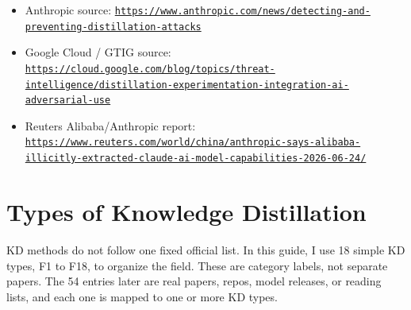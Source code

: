 \documentclass[10pt]{article}
\begin{document}
\begin{itemize}
\item Anthropic source: \href{https://www.anthropic.com/news/detecting-and-preventing-distillation-attacks}{\nolinkurl{https://www.anthropic.com/news/detecting-and-preventing-distillation-attacks}}
\item Google Cloud / GTIG source: \href{https://cloud.google.com/blog/topics/threat-intelligence/distillation-experimentation-integration-ai-adversarial-use}{\nolinkurl{https://cloud.google.com/blog/topics/threat-intelligence/distillation-experimentation-integration-ai-adversarial-use}}
\item Reuters Alibaba/Anthropic report: \href{https://www.reuters.com/world/china/anthropic-says-alibaba-illicitly-extracted-claude-ai-model-capabilities-2026-06-24/}{\nolinkurl{https://www.reuters.com/world/china/anthropic-says-alibaba-illicitly-extracted-claude-ai-model-capabilities-2026-06-24/}}
\end{itemize}



\section*{Types of Knowledge Distillation}

KD methods do not follow one fixed official list. In this guide, I use 18 simple KD types, F1 to F18, to organize the field. These are category labels, not separate papers. The 54 entries later are real papers, repos, model releases, or reading lists, and each one is mapped to one or more KD types.\par
\end{document}
